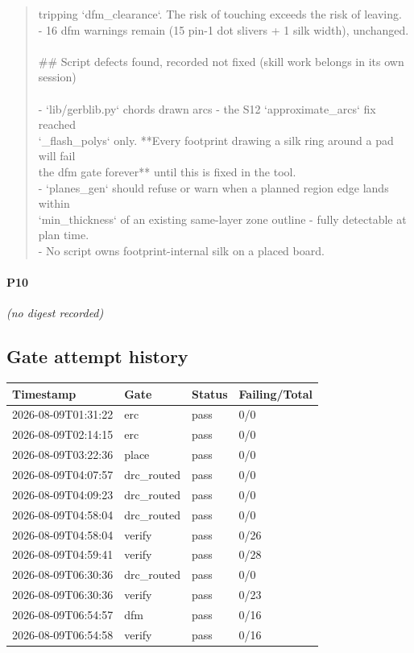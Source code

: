 \documentclass[11pt,a4paper]{article}
\begin{document}
\begin{quote}
  tripping `dfm\_clearance`. The risk of touching exceeds the risk of leaving.\\
- 16 dfm warnings remain (15 pin-1 dot slivers + 1 silk width), unchanged.\\
~\\
\#\# Script defects found, recorded not fixed (skill work belongs in its own session)\\
~\\
- `lib/gerblib.py` chords drawn arcs - the S12 `approximate\_arcs` fix reached\\
  `\_flash\_polys` only. {*}{*}Every footprint drawing a silk ring around a pad will fail\\
  the dfm gate forever{*}{*} until this is fixed in the tool.\\
- `planes\_gen` should refuse or warn when a planned region edge lands within\\
  `min\_thickness` of an existing same-layer zone outline - fully detectable at plan time.\\
- No script owns footprint-internal silk on a placed board.
\end{quote}
\paragraph*{P10}
\emph{(no digest recorded)}
\subsection*{Gate attempt history}
{\small
\begin{longtable}{llll}
\toprule
\textbf{Timestamp} & \textbf{Gate} & \textbf{Status} & \textbf{Failing/Total} \\
\midrule
\endhead
2026-08-09T01:31:22 & erc & pass & 0/0 \\
2026-08-09T02:14:15 & erc & pass & 0/0 \\
2026-08-09T03:22:36 & place & pass & 0/0 \\
2026-08-09T04:07:57 & drc\_routed & pass & 0/0 \\
2026-08-09T04:09:23 & drc\_routed & pass & 0/0 \\
2026-08-09T04:58:04 & drc\_routed & pass & 0/0 \\
2026-08-09T04:58:04 & verify & pass & 0/26 \\
2026-08-09T04:59:41 & verify & pass & 0/28 \\
2026-08-09T06:30:36 & drc\_routed & pass & 0/0 \\
2026-08-09T06:30:36 & verify & pass & 0/23 \\
2026-08-09T06:54:57 & dfm & pass & 0/16 \\
2026-08-09T06:54:58 & verify & pass & 0/16 \\
\bottomrule
\end{longtable}
}
\end{document}
